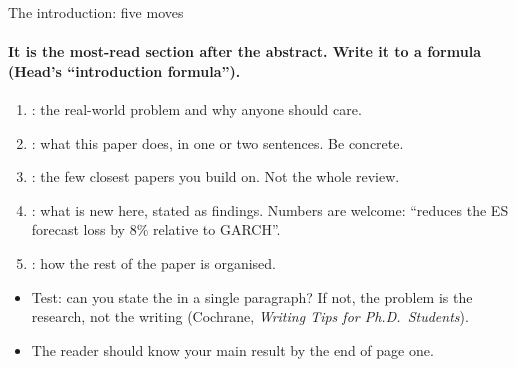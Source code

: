 \documentclass[aspectratio=169,11pt,t]{beamer}
\begin{document}
\begin{frame}{The introduction: five moves}
  \framesubtitle{It is the most-read section after the abstract. Write it to a formula (Head's ``introduction formula'').}
  \begin{enumerate}
    \item {}: the real-world problem and why anyone should care.
    \item {}: what this paper does, in one or two sentences. Be concrete.
    \item {}: the few closest papers you build on. Not the whole review.
    \item {}: what is new here, stated as findings. Numbers are welcome:
          ``reduces the ES forecast loss by 8\% relative to GARCH''.
    \item {}: how the rest of the paper is organised.
  \end{enumerate}

  \bigskip
  \begin{itemize}
    \item Test: can you state the  in a single paragraph? If not,
          the problem is the research, not the writing (Cochrane, \emph{Writing Tips for Ph.D.\ Students}).
    \item The reader should know your main result by the end of page one.
  \end{itemize}
\end{frame}
\end{document}

